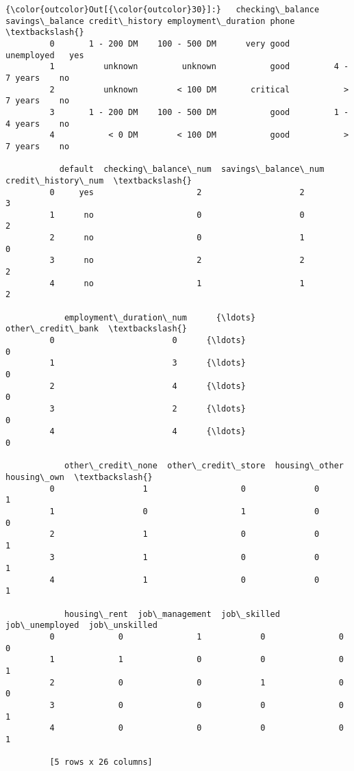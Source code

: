 \documentclass[11pt]{article}
\begin{document}
\begin{Verbatim}[commandchars=\\\{\}]
{\color{outcolor}Out[{\color{outcolor}30}]:}   checking\_balance savings\_balance credit\_history employment\_duration phone  \textbackslash{}
         0       1 - 200 DM    100 - 500 DM      very good          unemployed   yes   
         1          unknown         unknown           good         4 - 7 years    no   
         2          unknown        < 100 DM       critical           > 7 years    no   
         3       1 - 200 DM    100 - 500 DM           good         1 - 4 years    no   
         4           < 0 DM        < 100 DM           good           > 7 years    no   
         
           default  checking\_balance\_num  savings\_balance\_num  credit\_history\_num  \textbackslash{}
         0     yes                     2                    2                   3   
         1      no                     0                    0                   2   
         2      no                     0                    1                   0   
         3      no                     2                    2                   2   
         4      no                     1                    1                   2   
         
            employment\_duration\_num      {\ldots}        other\_credit\_bank  \textbackslash{}
         0                        0      {\ldots}                        0   
         1                        3      {\ldots}                        0   
         2                        4      {\ldots}                        0   
         3                        2      {\ldots}                        0   
         4                        4      {\ldots}                        0   
         
            other\_credit\_none  other\_credit\_store  housing\_other  housing\_own  \textbackslash{}
         0                  1                   0              0            1   
         1                  0                   1              0            0   
         2                  1                   0              0            1   
         3                  1                   0              0            1   
         4                  1                   0              0            1   
         
            housing\_rent  job\_management  job\_skilled  job\_unemployed  job\_unskilled  
         0             0               1            0               0              0  
         1             1               0            0               0              1  
         2             0               0            1               0              0  
         3             0               0            0               0              1  
         4             0               0            0               0              1  
         
         [5 rows x 26 columns]
\end{Verbatim}
            
\end{document}
